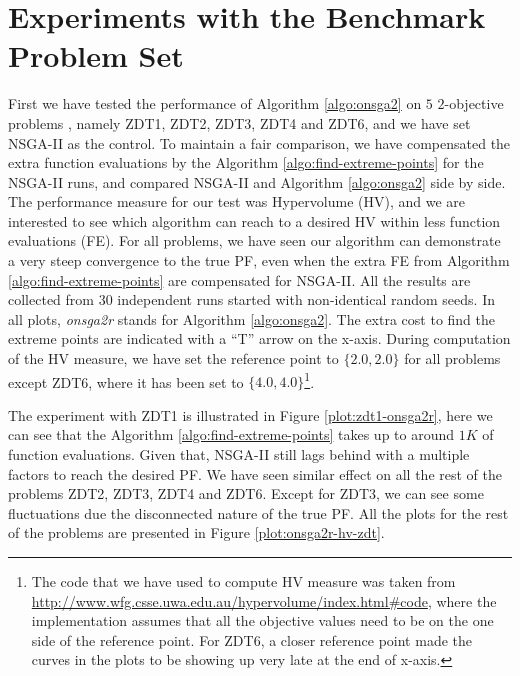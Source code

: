\documentclass[journal]{IEEEtran}
\begin{document}
\section{Experiments with the Benchmark Problem Set}
\label{sec:onsga2r-zdt}
First we have tested the performance of Algorithm \ref{algo:onsga2} on \(5\) \(2\)-objective problems \cite{zdt-set}, namely ZDT1, ZDT2, ZDT3, ZDT4 and ZDT6, and we have set NSGA-II as the control. To maintain a fair comparison, we have compensated the extra function evaluations by the Algorithm \ref{algo:find-extreme-points} for the NSGA-II runs, and compared NSGA-II and Algorithm \ref{algo:onsga2} side by side. The performance measure for our test was Hypervolume (HV), and we are interested to see which algorithm can reach to a desired HV within less function evaluations (FE). For all problems, we have seen our algorithm can demonstrate a very steep convergence to the true PF, even when the extra FE from Algorithm \ref{algo:find-extreme-points} are compensated for NSGA-II. All the results are collected from 30 independent runs started with non-identical random seeds. In all plots, \textit{onsga2r} stands for Algorithm \ref{algo:onsga2}. The extra cost to find the extreme points are indicated with a ``T'' arrow on the x-axis. During computation of the HV measure, we have set the reference point to \(\{2.0,2.0\}\) for all problems except ZDT6, where it has been set to \(\{4.0, 4.0\}\)\footnote{The code that we have used to compute HV measure was taken from \url{http://www.wfg.csse.uwa.edu.au/hypervolume/index.html#code}, where the implementation assumes that all the objective values need to be on the one side of the reference point. For ZDT6, a closer reference point made the curves in the plots to be showing up very late at the end of x-axis.}.

The experiment with ZDT1 is illustrated in Figure \ref{plot:zdt1-onsga2r}, here we can see that the Algorithm \ref{algo:find-extreme-points} takes up to around \(1K\) of function evaluations. Given that, NSGA-II still lags behind with a multiple factors to reach the desired PF. We have seen similar effect on all the rest of the problems ZDT2, ZDT3, ZDT4 and ZDT6. Except for ZDT3, we can see some fluctuations due the disconnected nature of the true PF. All the plots for the rest of the problems are presented in Figure \ref{plot:onsga2r-hv-zdt}.
\end{document}

